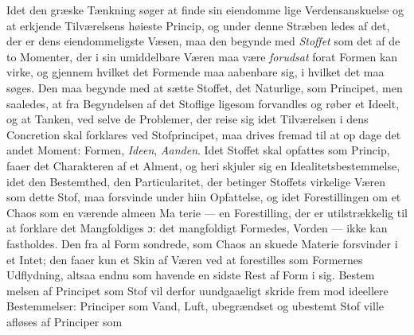 \documentclass[12pt,a4paper]{book}
\begin{document}
Idet den græske Tænkning søger at finde sin eiendomme\-%
lige Verdensanskuelse og at erkjende Tilværelsens høieste
Princip, og under denne Stræben ledes af det, der er dens
eiendommeligste Væsen, maa den begynde med \emph{Stoffet} som
det af de to Momenter, der i sin umiddelbare Væren maa
være \emph{forudsat} forat Formen kan virke, og gjennem hvilket
det Formende maa aabenbare sig, i hvilket det maa søges.
Den maa begynde med at sætte Stoffet, det Naturlige, som
Principet, men saaledes, at fra Begyndelsen af det Stoflige
ligesom forvandles og røber et Ideelt, og at Tanken, ved selve
de Problemer, der reise sig idet Tilværelsen i dens Concretion
skal forklares ved Stofprincipet, maa drives fremad til at op\-%
dage det andet Moment: Formen, \emph{Ideen}, \emph{Aanden}. Idet
Stoffet skal opfattes som Princip, faaer det Charakteren af et
Alment, og heri skjuler sig en Idealitetsbestemmelse, idet den
Bestemthed, den Particularitet, der betinger Stoffets virkelige
Væren som dette Stof, maa forsvinde under hiin Opfattelse, og
idet Forestillingen om et Chaos som en værende almeen Ma\-%
terie --- en Forestilling, der er utilstrækkelig til at forklare
det Mangfoldiges ɔ: det mangfoldigt Formedes, Vorden --- ikke
kan fastholdes. Den fra al Form sondrede, som Chaos an\-%
skuede Materie forsvinder i et Intet; den faaer kun et Skin
af Væren ved at forestilles som Formernes Udflydning, altsaa
endnu som havende en sidste Rest af Form i sig. Bestem\-%
melsen af Principet som Stof vil derfor uundgaaeligt skride
frem mod ideellere Bestemmelser: Principer som Vand, Luft,
ubegrændset og ubestemt Stof ville afløses af Principer som
\end{document}
